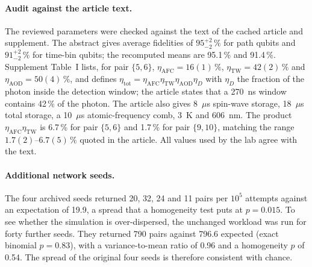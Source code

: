 \paragraph{Audit against the article text.}
The reviewed parameters were checked against the text of the cached article and supplement. The abstract gives average fidelities of $95^{+2}_{-2}\,\%$ for path qubits and $91^{+2}_{-2}\,\%$ for time-bin qubits; the recomputed means are 95.1\,\% and 91.4\,\%. Supplement Table~I lists, for pair $\{5,6\}$, $\eta_{\mathrm{AFC}}=16(1)\,\%$, $\eta_{\mathrm{TW}}=42(2)\,\%$ and $\eta_{\mathrm{AOD}}=50(4)\,\%$, and defines $\eta_{\mathrm{tot}}=\eta_{\mathrm{AFC}}\eta_{\mathrm{TW}}\eta_{\mathrm{AOD}}\eta_D$ with $\eta_D$ the fraction of the photon inside the detection window; the article states that a 270~ns window contains 42\,\% of the photon. The article also gives 8~$\mu$s spin-wave storage, 18~$\mu$s total storage, a 10~$\mu$s atomic-frequency comb, 3~K and 606~nm. The product $\eta_{\mathrm{AFC}}\eta_{\mathrm{TW}}$ is 6.7\,\% for pair $\{5,6\}$ and 1.7\,\% for pair $\{9,10\}$, matching the range $1.7(2)$--$6.7(5)\,\%$ quoted in the article. All values used by the lab agree with the text.

\paragraph{Additional network seeds.}
The four archived seeds returned 20, 32, 24 and 11 pairs per $10^5$ attempts against an expectation of 19.9, a spread that a homogeneity test puts at $p=0.015$. To see whether the simulation is over-dispersed, the unchanged workload was run for forty further seeds. They returned 790 pairs against 796.6 expected (exact binomial $p=0.83$), with a variance-to-mean ratio of 0.96 and a homogeneity $p$ of 0.54. The spread of the original four seeds is therefore consistent with chance.

